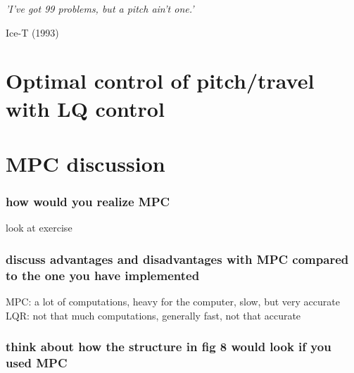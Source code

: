 \epigraph{\textit{'I've got 99 problems, but a pitch ain't one.'}}{Ice-T (1993)}
\section{Optimal control of pitch/travel with LQ control}

\section{MPC discussion}

\subsubsection{how would you realize MPC}
look at exercise 

\subsubsection{discuss advantages and disadvantages with MPC compared to the one you have implemented}
MPC: a lot of computations, heavy for the computer, slow, but very accurate
LQR: not that much computations, generally fast, not that accurate

\subsubsection{think about how the structure in fig 8 would look if you used MPC}